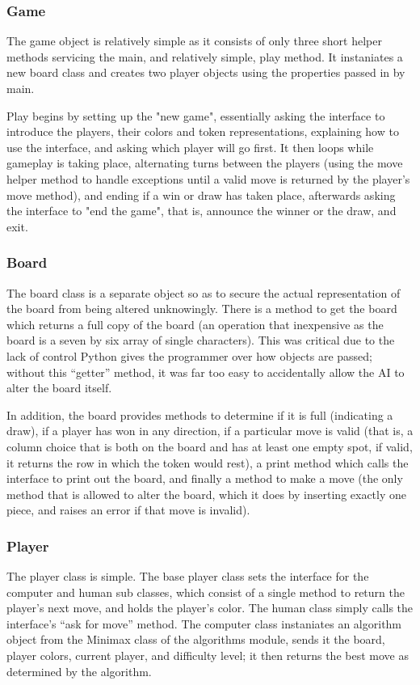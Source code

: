 \documentclass[12pt, article]{scrartcl}
\begin{document}
\subsubsection{Game}
The game object is relatively simple as it consists of only three short helper methods servicing the main, and relatively simple, play method. It instaniates a new board class and creates two player objects using the properties passed in by main.

Play begins by setting up the "new game", essentially asking the interface to introduce the players, their colors and token representations, explaining how to use the interface, and asking which player will go first. It then loops while gameplay is taking place, alternating turns between the players (using the move helper method to handle exceptions until a valid move is returned by the player's move method), and ending if a win or draw has taken place, afterwards asking the interface to "end the game", that is, announce the winner or the draw, and exit.

\subsubsection{Board}
The board class is a separate object so as to secure the actual representation of the board from being altered unknowingly. There is a method to get the board which returns a full copy of the board (an operation that inexpensive as the board is a seven by six array of single characters). This was critical due to the lack of control Python gives the programmer over how objects are passed; without this ``getter'' method, it was far too easy to accidentally allow the AI to alter the board itself.

In addition, the board provides methods to determine if it is full (indicating a draw), if a player has won in any direction, if a particular move is valid (that is, a column choice that is both on the board and has at least one empty spot, if valid, it returns the row in which the token would rest), a print method which calls the interface to print out the board, and finally a method to make a move (the only method that is allowed to alter the board, which it does by inserting exactly one piece, and raises an error if that move is invalid).

\subsubsection{Player}
The player class is simple. The base player class sets the interface for the computer and human sub classes, which consist of a single method to return the player's next move, and holds the player's color. The human class simply calls the interface's ``ask for move'' method. The computer class instaniates an algorithm object from the Minimax class of the algorithms module, sends it the board, player colors, current player, and difficulty level; it then returns the best move as determined by the algorithm.
\end{document}

